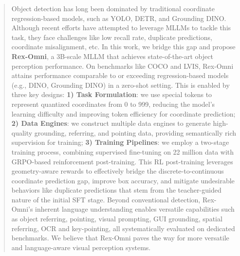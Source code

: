 \begin{abstract}
    Object detection has long been dominated by traditional coordinate regression-based models, such as YOLO, DETR, and Grounding DINO. Although recent efforts have attempted to leverage MLLMs to tackle this task, they face challenges like low recall rate, duplicate predictions, coordinate misalignment, etc. In this work, we bridge this gap and propose \textbf{Rex-Omni}, a 3B-scale MLLM that achieves state-of-the-art object perception performance. On benchmarks like COCO and LVIS, Rex-Omni attains performance comparable to or exceeding regression-based models (e.g., DINO, Grounding DINO) in a zero-shot setting. This is enabled by three key designs: \textbf{1) Task Formulation}: we use special tokens to represent quantized coordinates from 0 to 999, reducing the model's learning difficulty and improving token efficiency for coordinate prediction; \textbf{2) Data Engines}: we construct multiple data engines to generate high-quality grounding, referring, and pointing data, providing semantically rich supervision for training; \textbf{3) Training Pipelines}: we employ a two-stage training process, combining supervised fine-tuning on 22 million data with GRPO-based reinforcement post-training. This RL post-training leverages geometry-aware rewards to effectively bridge the discrete-to-continuous coordinate prediction gap, improve box accuracy, and mitigate undesirable behaviors like duplicate predictions that stem from the teacher-guided nature of the initial SFT stage. Beyond conventional detection, Rex-Omni's inherent language understanding enables versatile capabilities such as object referring, pointing, visual prompting, GUI grounding, spatial referring, OCR and key-pointing, all systematically evaluated on dedicated benchmarks. We believe that Rex-Omni paves the way for more versatile and language-aware visual perception systems.
\end{abstract}
